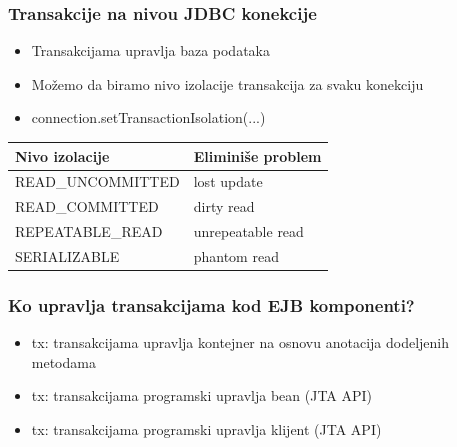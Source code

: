 \documentclass[compress]{beamer}
\begin{document}
\begin{frame}[fragile]
  \frametitle{Transakcije na nivou JDBC konekcije}
  \begin{itemize}
    \item Transakcijama upravlja baza podataka
    \item Možemo da biramo nivo izolacije transakcija za svaku konekciju
    \item connection.setTransactionIsolation(...)
  \end{itemize}

  \begin{tabular}{l|l}
    \textbf{Nivo izolacije} & \textbf{Eliminiše problem} \\ \hline
    READ\_UNCOMMITTED & lost update \\
    READ\_COMMITTED & dirty read \\
    REPEATABLE\_READ & unrepeatable read \\
    SERIALIZABLE & phantom read
  \end{tabular}
\end{frame}
\begin{frame}
  \frametitle{Ko upravlja transakcijama kod EJB komponenti?}
  \begin{itemize}
    \item {} tx: transakcijama upravlja kontejner na osnovu anotacija dodeljenih metodama
    \item {} tx: transakcijama programski upravlja bean (JTA API)
    \item {} tx: transakcijama programski upravlja klijent (JTA API)
  \end{itemize}
\end{frame}
\end{document}
